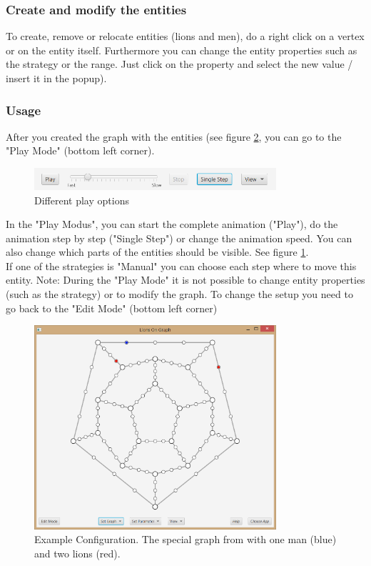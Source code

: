 \documentclass[a4paper]{article}
\begin{document}
\subsubsection*{Create and modify the entities}
To create, remove or relocate entities (lions and men), do a right click on a vertex or on the entity itself. Furthermore you can change the entity properties such as the strategy or the range. Just click on the property and select the new value / insert it in the popup).

\subsubsection*{Usage}
After you created the graph with the entities (see figure \ref{fig:graphConfig}, you can go to the "Play Mode" (bottom left corner).
\begin{figure}[hbt]
  \centering
    \includegraphics[width=0.8\textwidth]{play.PNG}
  \caption{Different play options}
  \label{fig:play}
\end{figure}
In the "Play Modus", you can start the complete animation ("Play"), do the animation step by step ("Single Step") or change the animation speed. You can also change which parts of the entities should be visible. See figure \ref{fig:play}.\\
If one of the strategies is "Manual" you can choose each step where to move this entity. Note: During the "Play Mode" it is not possible to change entity properties (such as the strategy) or to modify the graph. To change the setup you need to go back to the "Edit Mode" (bottom left corner)

\begin{figure}[hbt]
  \centering
    \includegraphics[width=0.8\textwidth]{graphApplet.PNG}
  \caption{Example Configuration. The special graph from \cite{paper} with one man (blue) and two lions (red).}
  \label{fig:graphConfig}
\end{figure}
\end{document}
